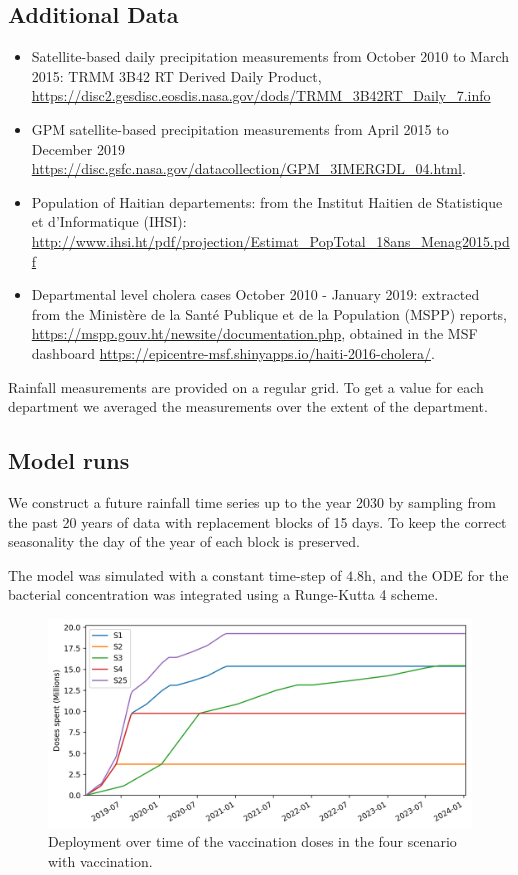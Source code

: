 \subsection{Additional Data}

\begin{itemize}
\item Satellite-based daily precipitation measurements from October 2010 to March 2015: TRMM 3B42 RT Derived Daily Product\cite{Huffman:TRMMMultisatellitePrecipitation:2007}, \url{https://disc2.gesdisc.eosdis.nasa.gov/dods/TRMM_3B42RT_Daily_7.info}
\item GPM satellite-based precipitation measurements from April 2015 to December 2019 \url{https://disc.gsfc.nasa.gov/datacollection/GPM_3IMERGDL_04.html}. %
\item Population of Haitian departements: from the Institut Haitien de Statistique et d'Informatique (IHSI): \url{http://www.ihsi.ht/pdf/projection/Estimat_PopTotal_18ans_Menag2015.pdf}
\item Departmental level cholera cases October 2010 - January 2019: extracted from the Ministère de la Santé Publique et de la Population (MSPP) reports, \url{https://mspp.gouv.ht/newsite/documentation.php}, obtained in the MSF dashboard \url{https://epicentre-msf.shinyapps.io/haiti-2016-cholera/}.
\end{itemize}

Rainfall measurements are provided on a regular grid. To get a value for each department we averaged the measurements over the extent of the department.

\subsection{Model runs}

We construct a future rainfall time series up to the year 2030 by sampling from the past 20 years of data  with replacement blocks of 15 days. To keep the correct seasonality the day of the year of each block is preserved.

The model was simulated with a constant time-step of $4.8$h, and the ODE for the bacterial concentration was integrated using a Runge-Kutta 4 scheme.

\begin{figure}
\begin{center}
\includegraphics[width=.6\textwidth]{fig_cholera-haiti-ocv/deploy.png}
\caption{Deployment over time of the vaccination doses in the four scenario with vaccination.}\label{figDeploy}
\end{center}
\end{figure}


